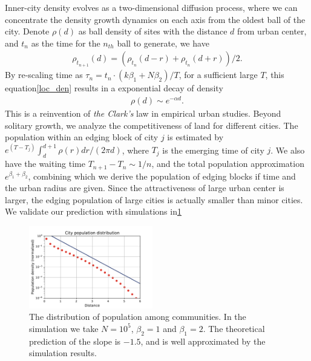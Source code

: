 \documentclass[reprint,unsortedaddress,amsmath,amssymb,floatfix,aps,prl,showkeys]{revtex4-2}
\begin{document}

Inner-city density evolves as a two-dimensional diffusion process, where we can concentrate the density growth dynamics on each axis from the oldest ball of the city. Denote $\rho(d)$ as ball density of sites with the distance $d$ from urban center, and $t_n$ as the time for the $n_{th}$ ball to generate, we have \begin{align}\rho_{t_{n+1}}(d) = (\rho_{t_{n}}(d-r) + \rho_{t_{n}}(d+r) )/2.\label{loc_den}\end{align} By re-scaling time as $\tau_n = t_n\cdot (k\beta_1+N\beta_2)/T$, for a sufficient large $T$, this equation\@s\ref{loc_den} results in a exponential decay of density
    \begin{align}
        \rho(d)\sim e^{-\alpha d}\label{clark_eq}.
    \end{align}
This is a reinvention of \emph{the Clark's} law in empirical urban studies\cite{clark1951urban}. Beyond solitary growth, we analyze the competitiveness of land for different cities. The population within an edging block of city $j$ is estimated by $e^{(T-T_j)}\int_{d}^{d+1}\rho(r)dr/(2\pi d)$, where $T_j$ is the emerging time of city $j$. We also have the waiting time $T_{n+1}-T_{n}\sim 1/n$, and the total population approximation $e^{\beta_1+\beta_2}$, combining which we derive the population of edging blocks if time and the urban radius are given. Since the attractiveness of large urban center is larger, the edging population of large cities is actually smaller than minor cities. We validate our prediction with simulations in\@\ref{fig:clark} %

\begin{figure}
    \centering
    \includegraphics[width=0.48\textwidth]{pics/kernal_density.pdf}
    \caption{The distribution of population among communities. In the simulation we take $N = 10^5$, $\beta_2=1$ and $\beta_1 = 2$. The theoretical prediction of the slope is $-1.5$, and is well approximated by the simulation results.}
    \label{fig:clark}
\end{figure}
\end{document}
